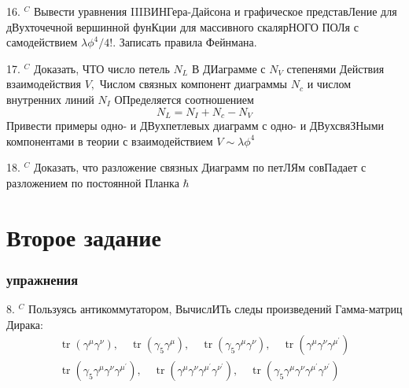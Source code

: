 \documentclass[a4paper,12pt]{article} %
\begin{document}
\begin{task}

16. $^{C}$ Вывести уравнения IIIBИНГера-Дайсона и графическое представЛение для дВухточечной вершинной фунКции для массивного скалярНОГО ПОЛя с самодействием $\lambda \phi^{4} / 4 ! .$ Записать правила Фейнмана.


\end{task}



\begin{task}

17. $^{C}$ Доказать, ЧТО число петель $N_{L}$ В ДИаграмме с $N_{V}$ степенями Действия взаимодействия $V,$ Числом связных компонент диаграммы $N_{c}$ и числом внутренних линий $N_{I}$ ОПределяется соотношением
$$
N_{L}=N_{I}+N_{c}-N_{V}
$$
Привести примеры одно- и ДВухпетлевых диаграмм с одно- и ДВухсвяЗНыми компонентами в теории с взаимодействием $V \sim \lambda \phi^{4}$


\end{task}



\begin{task}


18. $^{C}$ Доказать, что разложение связных Диаграмм по петЛЯм совПадает с разложением по постоянной Планка $\hbar$

\end{task}













\clearpage
\part{Второе задание}


\section{упражнения}

\begin{task}

8. $^{C}$ Пользуясь антикоммутатором, ВычислИТь следы произведений Гамма-матриц Дирака:
$$
\begin{array}{l}
\operatorname{tr}\left(\gamma^{\mu} \gamma^{\nu}\right), \quad \operatorname{tr}\left(\gamma_{5} \gamma^{\mu}\right), \quad \operatorname{tr}\left(\gamma_{5} \gamma^{\mu} \gamma^{\nu}\right), \quad \operatorname{tr}\left(\gamma^{\mu} \gamma^{\nu} \gamma^{\mu^{\prime}}\right) \\
\operatorname{tr}\left(\gamma_{5} \gamma^{\mu} \gamma^{\nu} \gamma^{\mu^{\prime}}\right), \quad \operatorname{tr}\left(\gamma^{\mu} \gamma^{\nu} \gamma^{\mu^{\prime}} \gamma^{\nu^{\prime}}\right), \quad \operatorname{tr}\left(\gamma_{5} \gamma^{\mu} \gamma^{\nu} \gamma^{\mu^{\prime}} \gamma^{\nu^{\prime}}\right)
\end{array}
$$


\end{task}
\end{document}
